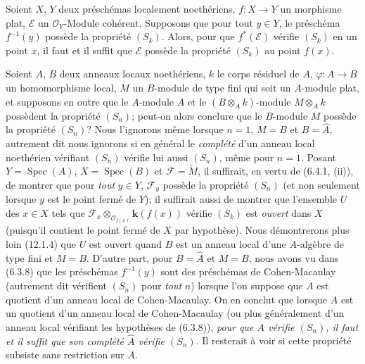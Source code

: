 \begin{corollary}[6.4.2]
\label{IV.2.s6.4.2-fr}
Soient $X$, $Y$ deux préschémas localement noethériens, $f:X\to Y$ un
morphisme plat, $\mathscr E$ un $\mathcal O_Y$-Module cohérent. Supposons que
pour tout $y\in Y$, le préschéma $f^{-1}(y)$ possède la propriété $(S_k)$.
Alors, pour que $f^*(\mathscr E)$ vérifie $(S_k)$ en un point $x$, il faut et
il suffit que $\mathscr E$ possède la propriété $(S_k)$ au point $f(x)$.
\end{corollary}

\begin{remark}[6.4.3]
\label{IV.2.s6.4.3-fr}
Soient $A$, $B$ deux anneaux locaux noethériens, $k$ le corps résiduel de
$A$, $\varphi:A\to B$ un homomorphisme local, $M$ un $B$-module de type fini
qui soit un $A$-module plat, et supposons en outre que le $A$-module $A$ et le
$(B\otimes_Ak)$-module $M\otimes_Ak$ possèdent la propriété $(S_n)$; peut-on
alors conclure que le $B$-module $M$ possède la propriété $(S_n)$? Nous
l'ignorons même lorsque $n=1$, $M=B$ et $B=\widehat A$, autrement dit nous
ignorons si en général le \emph{complété} d'un anneau local noethérien
vérifiant $(S_n)$ vérifie lui aussi $(S_n)$, même pour $n=1$. Posant
$Y=\operatorname{Spec}(A)$, $X=\operatorname{Spec}(B)$ et
$\mathscr F=\widetilde M$, il suffirait, en vertu de (6.4.1, (ii)), de montrer
que pour \emph{tout} $y\in Y$, $\mathscr F_y$ possède la propriété $(S_n)$
(et non seulement lorsque $y$ est le point fermé de $Y$); il suffirait aussi
de montrer que l'ensemble $U$ des $x\in X$ tels que
$\mathscr F_x\otimes_{\mathcal O_{f(x)}}\boldsymbol{k}(f(x))$ vérifie $(S_k)$ est \emph{ouvert}
dans $X$ (puisqu'il contient le point fermé de $X$ par hypothèse). Nous
démontrerons plus loin (12.1.4) que $U$ est ouvert quand $B$ est un anneau
local d'une $A$-algèbre de type fini et $M=B$. D'autre part, pour
$B=\widehat A$ et $M=B$, nous avons vu dans (6.3.8) que les préschémas
$f^{-1}(y)$ sont des préschémas de Cohen-Macaulay (autrement dit vérifient
$(S_n)$ pour \emph{tout} $n$) lorsque l'on suppose que $A$ est quotient d'un
anneau local de Cohen-Macaulay. On en conclut que lorsque $A$ est un quotient
d'un anneau local de Cohen-Macaulay (ou plus généralement d'un anneau local
vérifiant les hypothèses de (6.3.8)), \emph{pour que $A$ vérifie $(S_n)$, il
faut et il suffit que son complété $\widehat A$ vérifie $(S_n)$}. Il resterait
à voir si cette propriété subsiste sans restriction sur $A$.
\end{remark}


